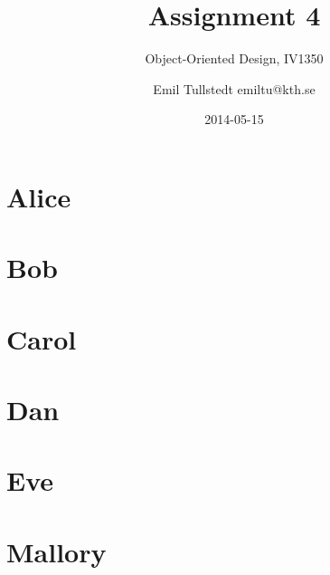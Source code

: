\documentclass[a4paper]{scrreprt}
\title{Assignment 4}
\subtitle{Object-Oriented Design, IV1350}
\author{Emil Tullstedt emiltu@kth.se}
\date{2014-05-15}
\begin{document}
\chapter{Alice}



\chapter{Bob}



\chapter{Carol}



\chapter{Dan}



\chapter{Eve}



\chapter{Mallory}


\end{document}
